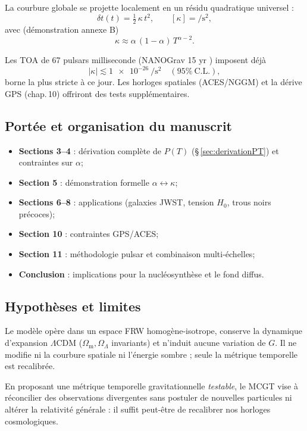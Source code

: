 \documentclass[11pt]{article}
\begin{document}
La courbure globale se projette localement en un résidu quadratique universel :
\[
\delta t(t)=\tfrac12\,\kappa\,t^{2},\qquad[\kappa]=\si{\per\square\second},
\]
avec (démonstration annexe B)
\[
\kappa \approx \alpha\,(1-\alpha)\,T^{\alpha-2}.
\]

Les TOA de 67 pulsars milliseconde (NANOGrav 15 yr \parencite{Arzoumanian2023}) imposent déjà
\[
\lvert\kappa\rvert \lesssim \SI{1e-26}{\per\square\second}\quad(95\%\ \text{C.L.}),
\]
borne la plus stricte à ce jour. Les horloges spatiales (ACES/NGGM) et la dérive GPS (chap.\,10) offriront des tests supplémentaires.

\subsection{Portée et organisation du manuscrit}

\begin{itemize}
  \item \textbf{Sections 3–4} : dérivation complète de \(P(T)\) (§\,\ref{sec:derivationPT}) et contraintes sur \(\alpha\);
  \item \textbf{Section 5} : démonstration formelle \(\alpha \leftrightarrow \kappa\);
\item \textbf{Sections 6–8} : applications (galaxies JWST, tension \(H_{0}\), trous noirs précoces);
  \item \textbf{Section 10} : contraintes GPS/ACES;
  \item \textbf{Section 11} : méthodologie pulsar et combinaison multi-échelles;
  \item \textbf{Conclusion} : implications pour la nucléosynthèse et le fond diffus.
\end{itemize}

\subsection{Hypothèses et limites}

Le modèle opère dans un espace FRW homogène-isotrope, conserve la dynamique d’expansion \(\Lambda\)CDM (\(\Omega_{\mathrm{m}},\Omega_{\Lambda}\) invariants) et n’induit aucune variation de \(G\).  
Il ne modifie ni la courbure spatiale ni l’énergie sombre ; seule la métrique temporelle est recalibrée.

\medskip
En proposant une métrique temporelle gravitationnelle \emph{testable}, le MCGT vise à réconcilier des observations divergentes sans postuler de nouvelles particules ni altérer la relativité générale : il suffit peut-être de recalibrer nos horloges cosmologiques.
\end{document}
